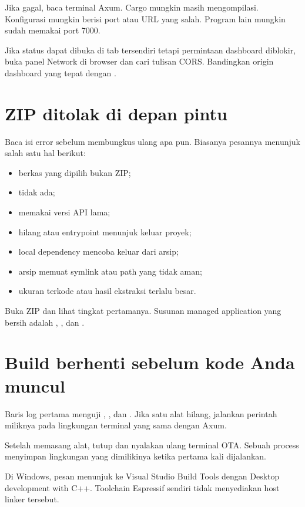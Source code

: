 Jika gagal, baca terminal Axum. Cargo mungkin masih mengompilasi. Konfigurasi mungkin berisi port atau URL yang salah. Program lain mungkin sudah memakai port 7000.

Jika status dapat dibuka di tab tersendiri tetapi permintaan dashboard diblokir, buka panel Network di browser dan cari tulisan CORS. Bandingkan origin dashboard yang tepat dengan .

\section{ZIP ditolak di depan pintu}

Baca isi error sebelum membungkus ulang apa pun. Biasanya pesannya menunjuk salah satu hal berikut:

\begin{itemize}
  \item berkas yang dipilih bukan ZIP;
  \item {} tidak ada;
  \item {} memakai versi API lama;
  \item {} hilang atau entrypoint menunjuk keluar proyek;
  \item local dependency mencoba keluar dari arsip;
  \item arsip memuat symlink atau path yang tidak aman;
  \item ukuran terkode atau hasil ekstraksi terlalu besar.
\end{itemize}

Buka ZIP dan lihat tingkat pertamanya. Susunan managed application yang bersih adalah , , dan .

\section{Build berhenti sebelum kode Anda muncul}

Baris log pertama menguji , , dan . Jika satu alat hilang, jalankan perintah  miliknya pada lingkungan terminal yang sama dengan Axum.

Setelah memasang alat, tutup dan nyalakan ulang terminal OTA. Sebuah process menyimpan lingkungan yang dimilikinya ketika pertama kali dijalankan.

Di Windows, pesan  menunjuk ke Visual Studio Build Tools dengan Desktop development with C++. Toolchain Espressif sendiri tidak menyediakan host linker tersebut.

